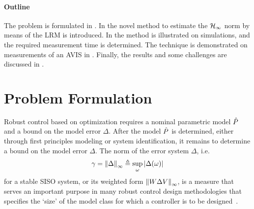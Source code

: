 \paragraph*{Outline}
\label{par:toc}
The problem is formulated in .
In  the novel method to estimate the $\mathcal{H}_{\infty}{}$ norm by means of the \gls{LRM} is introduced.
In  the method is illustrated on simulations, and the required measurement time is determined.
The technique is demonstrated on measurements of an \gls{AVIS} in .
Finally, the results and some challenges are discussed in .

\glsresetall %

\section{Problem Formulation}
\label{sec:Problem}
Robust control based on \Hinf{} optimization requires a nominal parametric model $\hat{P}$ and a bound on the model error $\Delta$. 
After the model $\hat{P}$ is determined, either through first principles modeling or system identification, it remains to determine a bound on the model error $\Delta$.
The \Hinf{} norm of the error system $\Delta$, i.e.
\begin{equation}
  \gamma 
     = 
       \left\| \Delta \right\|_{\infty} 
    \triangleq 
       \sup_{\omega} 
         \left| \Delta(\omega) \right|
  \label{eq:HinfNormSISO}
\end{equation}
for a stable \gls{SISO} system, or its weighted form $\left\| W \Delta V \right\|_{\infty}$, is a measure that serves an important purpose in many robust control design methodologies that specifies the `size' of the model class for which a controller is to be designed~\citep{Skogestad2005}.

